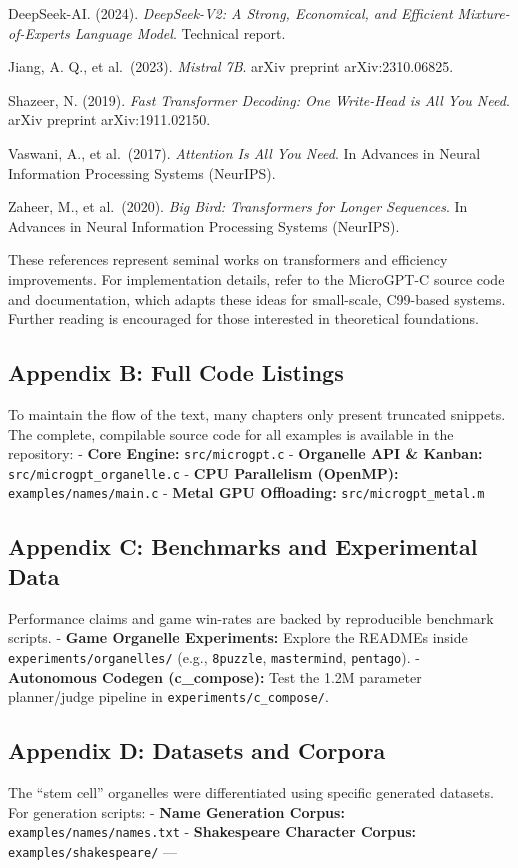 \documentclass[
]{article}
\begin{document}
DeepSeek-AI. (2024). \emph{DeepSeek-V2: A Strong, Economical, and
Efficient Mixture-of-Experts Language Model}. Technical report.

Jiang, A. Q., et al.~(2023). \emph{Mistral 7B}. arXiv preprint
arXiv:2310.06825.

Shazeer, N. (2019). \emph{Fast Transformer Decoding: One Write-Head is
All You Need}. arXiv preprint arXiv:1911.02150.

Vaswani, A., et al.~(2017). \emph{Attention Is All You Need}. In
Advances in Neural Information Processing Systems (NeurIPS).

Zaheer, M., et al.~(2020). \emph{Big Bird: Transformers for Longer
Sequences}. In Advances in Neural Information Processing Systems
(NeurIPS).

These references represent seminal works on transformers and efficiency
improvements. For implementation details, refer to the MicroGPT-C source
code and documentation, which adapts these ideas for small-scale,
C99-based systems. Further reading is encouraged for those interested in
theoretical foundations.

\subsection{Appendix B: Full Code
Listings}\label{appendix-b-full-code-listings}

To maintain the flow of the text, many chapters only present truncated
snippets. The complete, compilable source code for all examples is
available in the repository: - \textbf{Core Engine:}
\texttt{src/microgpt.c} - \textbf{Organelle API \& Kanban:}
\texttt{src/microgpt\_organelle.c} - \textbf{CPU Parallelism (OpenMP):}
\texttt{examples/names/main.c} - \textbf{Metal GPU Offloading:}
\texttt{src/microgpt\_metal.m}

\subsection{Appendix C: Benchmarks and Experimental
Data}\label{appendix-c-benchmarks-and-experimental-data}

Performance claims and game win-rates are backed by reproducible
benchmark scripts. - \textbf{Game Organelle Experiments:} Explore the
READMEs inside \texttt{experiments/organelles/} (e.g., \texttt{8puzzle},
\texttt{mastermind}, \texttt{pentago}). - \textbf{Autonomous Codegen
(c\_compose):} Test the 1.2M parameter planner/judge pipeline in
\texttt{experiments/c\_compose/}.

\subsection{Appendix D: Datasets and
Corpora}\label{appendix-d-datasets-and-corpora}

The ``stem cell'' organelles were differentiated using specific
generated datasets. For generation scripts: - \textbf{Name Generation
Corpus:} \texttt{examples/names/names.txt} - \textbf{Shakespeare
Character Corpus:} \texttt{examples/shakespeare/} ---
\end{document}
